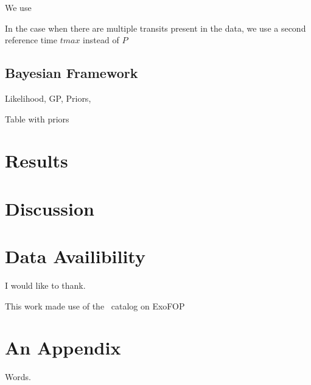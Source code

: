 \documentclass[modern]{aastex63}
\begin{document}
We use \exoplanet\, \lightkurve


In the case when there are multiple transits present in the data, we use a second reference time $tmax$ instead of $P$



\subsection{Bayesian Framework}


Likelihood, GP, Priors, \celerite


Table with priors

%
%
%
%





\section{Results}

\section{Discussion}

\section{Data Availibility}



\acknowledgments

I would like to thank.



This work made use of the \tess\ catalog on ExoFOP

\vspace{5mm}


\appendix

\section{An Appendix}

Words.

{}

\end{document}

